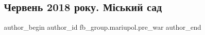  
 
 
 
 

\subsection{Червень 2018 року. Міський сад}
\label{sec:09_02_2023.fb.fb_group.mariupol.pre_war.8.cherven_2018_roku__m}

\ifcmt
 author_begin
   author_id fb_group.mariupol.pre_war
 author_end
\fi
